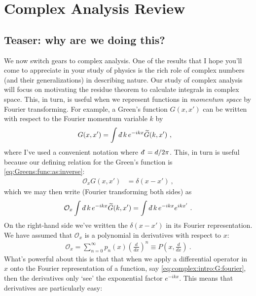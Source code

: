 
\section{Complex Analysis Review}

\subsection{Teaser: why are we doing this?}

We now switch gears to complex analysis. One of the results that I hope you'll come to appreciate in your study of physics is the rich role of complex numbers (and their generalizations) in describing nature. Our study of complex analysis will focus on motivating the residue theorem to calculate integrals in complex space. This, in turn, is useful when we represent functions in \emph{momentum space} by Fourier transforming. For example, a Green's function $G(x,x')$ can be written with respect to the Fourier momentum variable $k$ by
\begin{align}
	G(x,x') &= \int \dbar k \, e^{-ikx} \tilde G(k,x') \ ,
	\label{eq:complex:intro:G:fourier}
\end{align}
where I've used a convenient notation where $\dbar = d/2\pi$. This, in turn is useful because our defining relation for the Green's function is \eqref{eq:Greens:func:as:inverse}:
\begin{align}
	\mathcal O_xG(x,x') &= \delta(x-x') \ ,
\end{align}
which we may then write (Fourier transforming both sides) as
\begin{align}
	\mathcal O_x \int \dbar k \, e^{-ikx} \tilde G(k,x') 
	=
	\int \dbar k \, e^{-ikx} e^{ikx'} \ .
	\label{eq:complex:intro:defining:G:}
\end{align}
On the right-hand side we've written the $\delta(x-x')$ in its Fourier representation. We have assumed that $\mathcal O_x$ is a polynomial in derivatives with respect to $x$:
\begin{align}
	\mathcal O_x = \sum_{n=0}^{\infty}
	p_n(x) \left(\frac{d}{dx}\right)^n
	\equiv P\left(x,\frac{d}{dx}\right) \ .
	\label{eq:complex:intro:defining:Ox}
\end{align}
What's powerful about this is that that when we apply a differential operator in $x$ onto the Fourier representation of a function, say \eqref{eq:complex:intro:G:fourier}, then the derivatives only `see' the exponential factor $e^{-ikx}$. This means that derivatives are particularly easy:
